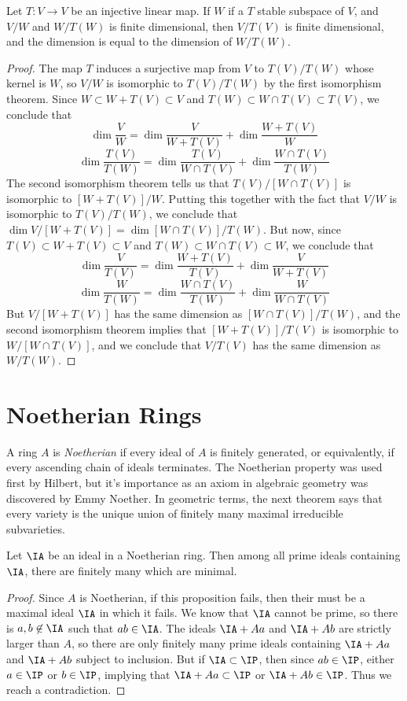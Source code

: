 \begin{theorem}
    Let $T:V \to V$ be an injective linear map. If $W$ if a $T$ stable subspace of $V$, and $V/W$ and $W/T(W)$ is finite dimensional, then $V/T(V)$ is finite dimensional, and the dimension is equal to the dimension of $W/T(W)$.
\end{theorem}
\begin{proof}
    The map $T$ induces a surjective map from $V$ to $T(V)/T(W)$ whose kernel is $W$, so $V/W$ is isomorphic to $T(V)/T(W)$ by the first isomorphism theorem. Since $W \subset W + T(V) \subset V$ and $T(W) \subset W \cap T(V) \subset T(V)$, we conclude that
    \[ \dim \frac{V}{W} = \dim \frac{V}{W + T(V)} + \dim \frac{W + T(V)}{W} \]
    \[ \dim \frac{T(V)}{T(W)} = \dim \frac{T(V)}{W \cap T(V)} + \dim \frac{W \cap T(V)}{T(W)} \]
    The second isomorphism theorem tells us that $T(V)/[W \cap T(V)]$ is isomorphic to $[W + T(V)]/W$. Putting this together with the fact that $V/W$ is isomorphic to $T(V)/T(W)$, we conclude that $\dim V/[W + T(V)] = \dim [W \cap T(V)]/T(W)$. But now, since $T(V) \subset W + T(V) \subset V$ and $T(W) \subset W \cap T(V) \subset W$, we conclude that
    \[ \dim \frac{V}{T(V)} = \dim \frac{W + T(V)}{T(V)} + \dim \frac{V}{W + T(V)} \]
    \[ \dim \frac{W}{T(W)} = \dim \frac{W \cap T(V)}{T(W)} + \dim \frac{W}{W \cap T(V)} \]
    But $V/[W + T(V)]$ has the same dimension as $[W \cap T(V)]/T(W)$, and the second isomorphism theorem implies that $[W + T(V)]/T(V)$ is isomorphic to $W/[W \cap T(V)]$, and we conclude that $V/T(V)$ has the same dimension as $W/T(W)$.
\end{proof}




\chapter{Noetherian Rings}

A ring $A$ is \emph{Noetherian} if every ideal of $A$ is finitely generated, or equivalently, if every ascending chain of ideals terminates. The Noetherian property was used first by Hilbert, but it's importance as an axiom in algebraic geometry was discovered by Emmy Noether. In geometric terms, the next theorem says that every variety is the unique union of finitely many maximal irreducible subvarieties.

\begin{theorem}
    Let $\IA$ be an ideal in a Noetherian ring. Then among all prime ideals containing $\IA$, there are finitely many which are minimal.
\end{theorem}
\begin{proof}
    Since $A$ is Noetherian, if this proposition fails, then their must be a maximal ideal $\IA$ in which it fails. We know that $\IA$ cannot be prime, so there is $a,b \not \in \IA$ such that $ab \in \IA$. The ideals $\IA + Aa$ and $\IA + Ab$ are strictly larger than $A$, so there are only finitely many prime ideals containing $\IA + Aa$ and $\IA + Ab$ subject to inclusion. But if $\IA \subset \IP$, then since $ab \in \IP$, either $a \in \IP$ or $b \in \IP$, implying that $\IA + Aa \subset \IP$ or $\IA + Ab \in \IP$. Thus we reach a contradiction.
\end{proof}


